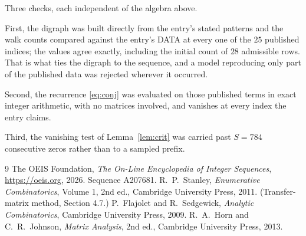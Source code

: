 \documentclass[11pt,a4paper]{article}
\theoremstyle{plain}
\theoremstyle{definition}
\begin{document}
Three checks, each independent of the algebra above.

First, the digraph was built directly from the entry's stated patterns and the walk counts
compared against the entry's DATA at every one of the $25$ published indices; the
values agree exactly, including the initial count of $28$ admissible rows. That is
what ties the digraph to the sequence, and a model reproducing only part of the published
data was rejected wherever it occurred.

Second, the recurrence \eqref{eq:conj} was evaluated on those published terms in exact
integer arithmetic, with no matrices involved, and vanishes at every index the entry claims.

Third, the vanishing test of Lemma~\ref{lem:crit} was carried past $S=784$ consecutive
zeros rather than to a sampled prefix.

\begin{thebibliography}{9}
 The OEIS Foundation, \emph{The On-Line Encyclopedia of Integer
Sequences}, \url{https://oeis.org}, 2026. Sequence A207681.
 R.~P.~Stanley, \emph{Enumerative Combinatorics}, Volume 1, 2nd ed.,
Cambridge University Press, 2011. (Transfer-matrix method, Section 4.7.)
 P.~Flajolet and R.~Sedgewick, \emph{Analytic Combinatorics}, Cambridge
University Press, 2009.
 R.~A.~Horn and C.~R.~Johnson, \emph{Matrix Analysis}, 2nd ed., Cambridge
University Press, 2013.
\end{thebibliography}
\end{document}
